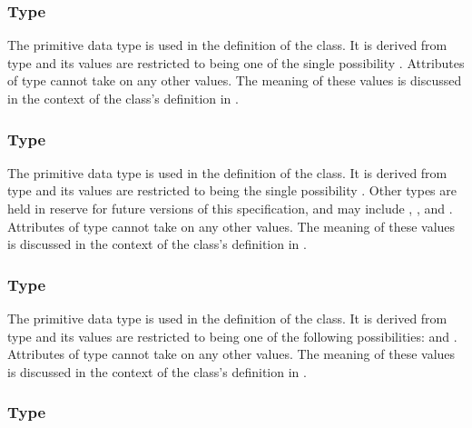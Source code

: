 \subsubsection{Type \fixttspace{}}
\label{primtype-FunctionKind}

The  primitive data type is used in the definition of the \AnalyticVolume class.  It is derived from type  and its values are restricted to being one of the single possibility .  Attributes of type  cannot take on any other values.  The meaning of these values is discussed in the context of the \AnalyticVolume class's definition in .


\subsubsection{Type \fixttspace{}}
\label{primtype-GeometryKind}

The  primitive data type is used in the definition of the \Geometry class.  It is derived from type  and its values are restricted to being the single possibility .  Other  types are held in reserve for future versions of this specification, and may include , , and .  Attributes of type  cannot take on any other values.  The meaning of these values is discussed in the context of the \Geometry class's definition in .


\subsubsection{Type \fixttspace{}}
\label{primtype-InterpolationKind}

The  primitive data type is used in the definition of the \SampledField class.  It is derived from type  and its values are restricted to being one of the following possibilities:  and .  Attributes of type  cannot take on any other values.  The meaning of these values is discussed in the context of the \SampledField class's definition in .


\subsubsection{Type \fixttspace{}}
\label{primtype-PolygonKind}

